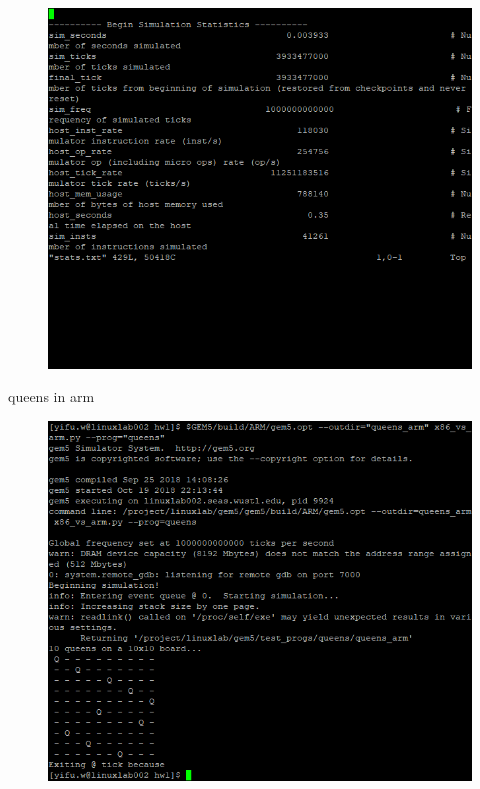 \documentclass{article}
\begin{document}
\begin{figure}[H]\centering\includegraphics{11.png}\end{figure}
queens in arm
\begin{figure}[H]\centering\includegraphics{4.png}\end{figure}
\end{document}
